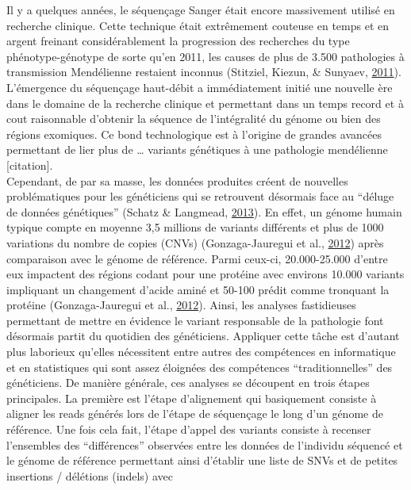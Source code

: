 \documentclass[12pt,twoside]{reedthesis}
\theoremstyle{definition}
\theoremstyle{definition}
\theoremstyle{remark}
\begin{document}
  Il y a quelques années, le séquençage Sanger était encore massivement
  utilisé en recherche clinique. Cette technique était extrêmement
  couteuse en temps et en argent freinant considérablement la progression
  des recherches du type phénotype-génotype de sorte qu'en 2011, les
  causes de plus de 3.500 pathologies à transmission Mendélienne restaient
  inconnus (Stitziel, Kiezun, \& Sunyaev,
  \protect\hyperlink{ref-Stitziel2011}{2011}). L'émergence du séquençage
  haut-débit a immédiatement initié une nouvelle ère dans le domaine de la
  recherche clinique et permettant dans un temps record et à cout
  raisonnable d'obtenir la séquence de l'intégralité du génome ou bien des
  régions exomiques. Ce bond technologique est à l'origine de grandes
  avancées permettant de lier plus de \ldots{} variants génétiques à une
  pathologie mendélienne {[}citation{]}.\\
  Cependant, de par sa masse, les données produites créent de nouvelles
  problématiques pour les généticiens qui se retrouvent désormais face au
  ``déluge de données génétiques'' (Schatz \& Langmead,
  \protect\hyperlink{ref-Schatz2013}{2013}). En effet, un génome humain
  typique compte en moyenne 3,5 millions de variants différents et plus de
  1000 variations du nombre de copies (CNVs) (Gonzaga-Jauregui et al.,
  \protect\hyperlink{ref-Gonzaga-Jauregui2012}{2012}) après comparaison
  avec le génome de référence. Parmi ceux-ci, 20.000-25.000 d'entre eux
  impactent des régions codant pour une protéine avec environs 10.000
  variants impliquant un changement d'acide aminé et 50-100 prédit comme
  tronquant la protéine (Gonzaga-Jauregui et al.,
  \protect\hyperlink{ref-Gonzaga-Jauregui2012}{2012}). Ainsi, les analyses
  fastidieuses permettant de mettre en évidence le variant responsable de
  la pathologie font désormais partit du quotidien des généticiens.
  Appliquer cette tâche est d'autant plus laborieux qu'elles nécessitent
  entre autres des compétences en informatique et en statistiques qui sont
  assez éloignées des compétences ``traditionnelles'' des généticiens. De
  manière générale, ces analyses se découpent en trois étapes principales.
  La première est l'étape d'alignement qui basiquement consiste à aligner
  les reads générés lors de l'étape de séquençage le long d'un génome de
  référence. Une fois cela fait, l'étape d'appel des variants consiste à
  recenser l'ensembles des ``différences'' observées entre les données de
  l'individu séquencé et le génome de référence permettant ainsi d'établir
  une liste de SNVs et de petites insertions / délétions (indels) avec
\end{document}
